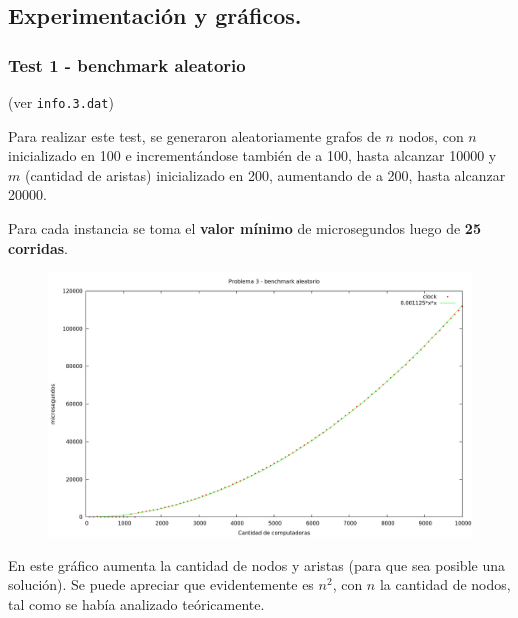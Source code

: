 \subsection{Experimentación y gráficos.}

\vspace*{0.3cm}

\subsubsection{Test 1 - benchmark aleatorio}

(ver \verb|info.3.dat|) \medskip

Para realizar este test, se generaron aleatoriamente grafos de $n$ nodos, con  $n$ inicializado en 100 e incrementándose también de a 100, hasta alcanzar 10000 y $m$ (cantidad de aristas) inicializado en 200, aumentando de a 200, hasta alcanzar 20000.

Para cada instancia se toma el \textbf{valor mínimo} de microsegundos luego de
\textbf{25 corridas}.

\vspace*{0.5cm}

\begin{figure}[h]
  \begin{center}
    \includegraphics[scale=0.35]{imagenes/grafico-3.png}
  \end{center}
\end{figure}

\vspace*{0.5cm}

En este gráfico aumenta la cantidad de nodos y aristas (para que sea
posible una solución). Se puede apreciar que evidentemente es $n^2$, con $n$ la cantidad de nodos, tal como se había analizado teóricamente.



